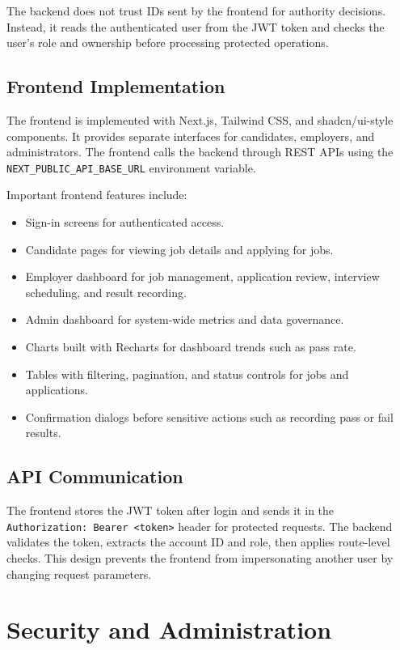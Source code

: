 \documentclass[12pt,a4paper]{report}
\begin{document}
The backend does not trust IDs sent by the frontend for authority decisions. Instead, it reads the authenticated user from the JWT token and checks the user's role and ownership before processing protected operations.

\section{Frontend Implementation}

The frontend is implemented with Next.js, Tailwind CSS, and shadcn/ui-style components. It provides separate interfaces for candidates, employers, and administrators. The frontend calls the backend through REST APIs using the \texttt{NEXT\_PUBLIC\_API\_BASE\_\allowbreak{}URL} environment variable.

Important frontend features include:

\begin{itemize}[leftmargin=1.5cm]
  \item Sign-in screens for authenticated access.
  \item Candidate pages for viewing job details and applying for jobs.
  \item Employer dashboard for job management, application review, interview scheduling, and result recording.
  \item Admin dashboard for system-wide metrics and data governance.
  \item Charts built with Recharts for dashboard trends such as pass rate.
  \item Tables with filtering, pagination, and status controls for jobs and applications.
  \item Confirmation dialogs before sensitive actions such as recording pass or fail results.
\end{itemize}

\section{API Communication}

The frontend stores the JWT token after login and sends it in the \texttt{Authorization: Bearer <token>} header for protected requests. The backend validates the token, extracts the account ID and role, then applies route-level checks. This design prevents the frontend from impersonating another user by changing request parameters.

\chapter{Security and Administration}
\end{document}
